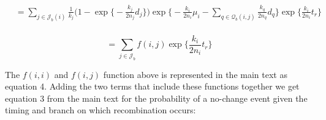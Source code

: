 \documentclass[11pt]{article}
\begin{document}



\begin{equation}
\begin{aligned}
	&= \sum_{j \in \mathcal{J}_b(i)} 
	  \frac{1}{k_j}
	  \bigg(1 - \exp 
		  \bigg\{
			  -\frac{k_j}{2n_j} d_j 
		  \bigg\}
	  \bigg)
	  \exp \bigg\{
		  -\frac{k_i}{2n_i} \mu_i - 
		  \sum_{q \in \mathcal{Q}_b(i,j)}
		  \frac{k_q}{2n_q} d_q
		  \bigg\}
	  \exp \bigg\{
		  \frac{k_i}{2n_i} t_r
		  \bigg\}\\
\end{aligned}
\end{equation}



\begin{equation}
	= \sum_{j \in \mathcal{J}_b} 
	f(i,j)
	\exp \bigg\{ \frac{k_i}{2n_i} t_r \bigg\}
\end{equation}


\noindent The $f(i,i)$ and $f(i,j)$ function above is represented in the main
text as equation 4. Adding the two terms that include these functions 
together we get equation 3 from the main text for the probability of a
no-change event given the timing and branch on which recombination occurs:
\end{document}
